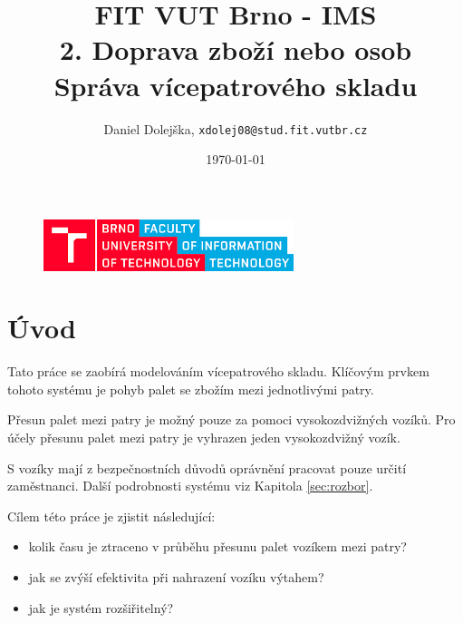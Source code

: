 \documentclass[11pt]{article}
\title{\textbf{FIT VUT Brno - IMS}\\
	2. Doprava zboží nebo osob\\
	Správa vícepatrového skladu}
\author{Daniel Dolejška, \texttt{xdolej08@stud.fit.vutbr.cz}}
\date{\today}
\begin{document}
	
	\maketitle
	\vfill
	\begin{figure}[hb]
		\centering
		\includegraphics[width=0.65\textwidth]{images/fit-vutbr.png}
	\end{figure}
	
	\newpage
	\tableofcontents
	
	
	\newpage
	
	\section{Úvod}
	Tato práce se zaobírá modelováním\cite[str.~8]{ims-prezentace} vícepatrového skladu.
	Klíčovým prvkem tohoto systému\cite[str.~7]{ims-prezentace} je pohyb palet se zbožím mezi jednotlivými patry.
	
	Přesun palet mezi patry je možný pouze za pomoci vysokozdvižných vozíků.
	Pro účely přesunu palet mezi patry je vyhrazen jeden vysokozdvižný vozík.
	
	S vozíky mají z bezpečnostních důvodů oprávnění pracovat pouze určití zaměstnanci.
	Další podrobnosti systému viz Kapitola \ref{sec:rozbor}.
	
	Cílem této práce je zjistit následující:
	\begin{itemize}
		\item kolik času je ztraceno v průběhu přesunu palet vozíkem mezi patry?
		\item jak se zvýší efektivita při nahrazení vozíku výtahem?
		\item jak je systém rozšiřitelný?
	\end{itemize}
\end{document}
